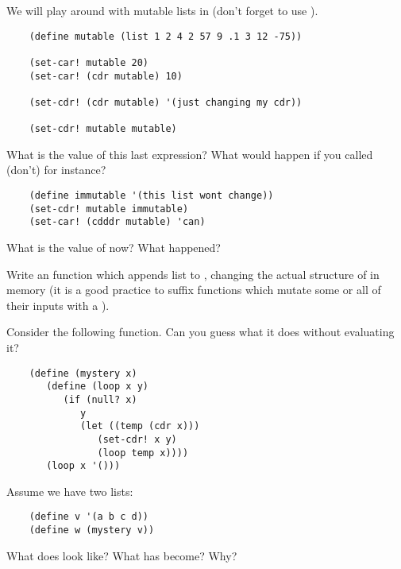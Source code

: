 \documentclass{../../../tp}
\begin{document}
\begin{instruction}
	We will play around with mutable lists in \scheme (don't forget to use ).

	\begin{verbatim}
	(define mutable (list 1 2 4 2 57 9 .1 3 12 -75))

	(set-car! mutable 20)
	(set-car! (cdr mutable) 10)
	
	(set-cdr! (cdr mutable) '(just changing my cdr))
	 
	(set-cdr! mutable mutable)
	 \end{verbatim}

	What is the value of this last expression? What would happen if you called (don't)  for instance?
	
	\begin{verbatim}	
	(define immutable '(this list wont change))
	(set-cdr! mutable immutable)
	(set-car! (cdddr mutable) 'can)
	 \end{verbatim}
	 
	 What is the value of  now? What happened? 	
\end{instruction}

\begin{instruction}
	Write an  function which appends list  to , changing the actual structure of  in memory (it is a good \scheme practice to suffix functions which mutate some or all of their inputs with a \schemecode{!}).  
\end{instruction}


\begin{instruction}
	
	Consider the following  function. Can you guess what it does without evaluating it? 
	
	\begin{verbatim}
	(define (mystery x)
	   (define (loop x y)
	      (if (null? x)
	         y
	         (let ((temp (cdr x)))
	            (set-cdr! x y)
	            (loop temp x))))
	   (loop x '()))
	\end{verbatim}
	
	Assume we have two lists:
	
	\begin{verbatim}
	(define v '(a b c d))
	(define w (mystery v))
	\end{verbatim}
	
	What does  look like? What has  become? Why?
	
\end{instruction}
\end{document}
